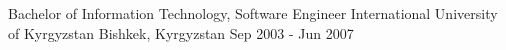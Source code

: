 

\begin{cventries}

  \cventry
    {Bachelor of Information Technology, Software Engineer} %
    {International University of Kyrgyzstan} %
    {Bishkek, Kyrgyzstan} %
    {Sep 2003 - Jun 2007} %
    {}

  \vspace{-5.0mm}
\end{cventries}
